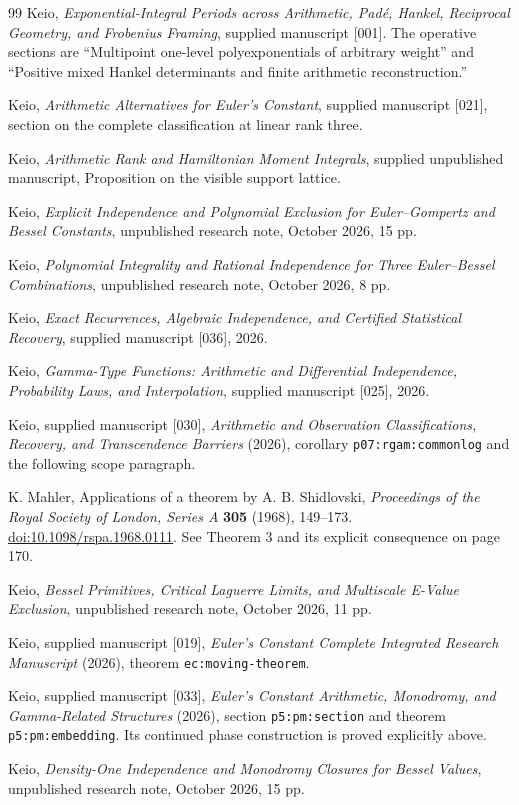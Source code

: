 \documentclass[11pt]{article}
\theoremstyle{definition}
\theoremstyle{remark}
\begin{document}
\begin{thebibliography}{99}
Keio,
\emph{Exponential-Integral Periods across Arithmetic, Pad\'e, Hankel,
Reciprocal Geometry, and Frobenius Framing}, supplied manuscript [001].
The operative sections are ``Multipoint one-level polyexponentials of
arbitrary weight'' and ``Positive mixed Hankel determinants and finite
arithmetic reconstruction.''

Keio,
\emph{Arithmetic Alternatives for Euler's Constant}, supplied manuscript
[021], section on the complete classification at linear rank three.

Keio,
\emph{Arithmetic Rank and Hamiltonian Moment Integrals}, supplied
unpublished manuscript, Proposition on the visible support lattice.

Keio, \emph{Explicit Independence and Polynomial Exclusion for Euler--Gompertz and Bessel Constants}, unpublished research note, October 2026, 15 pp.

Keio, \emph{Polynomial Integrality and Rational Independence for Three Euler--Bessel Combinations}, unpublished research note, October 2026, 8 pp.

Keio, \emph{Exact Recurrences, Algebraic Independence, and Certified
Statistical Recovery}, supplied manuscript [036], 2026.

Keio, \emph{Gamma-Type Functions: Arithmetic and Differential
Independence, Probability Laws, and Interpolation}, supplied
manuscript [025], 2026.

Keio, supplied manuscript [030], \emph{Arithmetic and Observation
Classifications, Recovery, and Transcendence Barriers} (2026),
corollary \texttt{p07:rgam:commonlog} and the following scope paragraph.

K. Mahler, Applications of a theorem by A. B. Shidlovski,
\emph{Proceedings of the Royal Society of London, Series A}
\textbf{305} (1968), 149--173.
\href{https://doi.org/10.1098/rspa.1968.0111}{doi:10.1098/rspa.1968.0111}.
See Theorem 3 and its explicit consequence on page 170.

Keio, \emph{Bessel Primitives, Critical Laguerre Limits, and Multiscale E-Value Exclusion}, unpublished research note, October 2026, 11 pp.

Keio, supplied manuscript [019], \emph{Euler's Constant Complete
Integrated Research Manuscript} (2026), theorem
\texttt{ec:moving-theorem}.

Keio, supplied manuscript [033], \emph{Euler's Constant Arithmetic,
Monodromy, and Gamma-Related Structures} (2026), section
\texttt{p5:pm:section} and theorem \texttt{p5:pm:embedding}.
Its continued phase construction is proved explicitly above.

Keio, \emph{Density-One Independence and Monodromy Closures for Bessel Values}, unpublished research note, October 2026, 15 pp.
\end{thebibliography}
\end{document}

